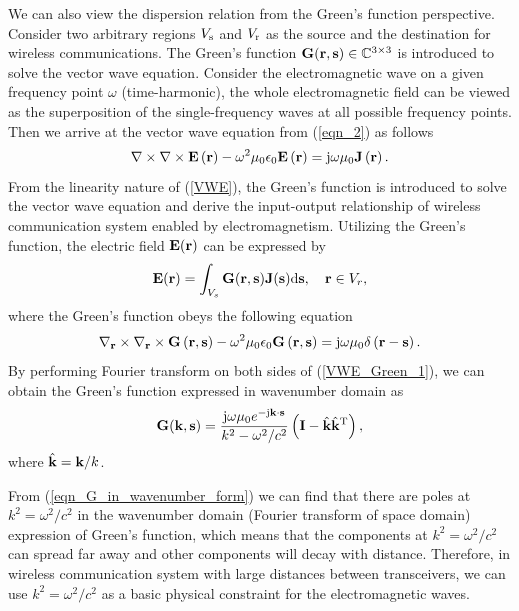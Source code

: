 \documentclass[12pt,draftclsnofoot,journal,onecolumn]{IEEEtran}
\begin{document}
{We can also view the dispersion relation from the Green's function perspective. Consider two arbitrary regions $V_{\rm s}$ and $V_{\rm r}$ as the source and the destination for wireless communications. The Green's function ${\bf{G}} ({\bf{r}},{\bf{s}})\in \mathbb{C}^{3\times 3}$ is introduced to solve the vector wave equation. Consider the electromagnetic wave on a given frequency point $\omega$ (time-harmonic)\cite{gruber2008new}, the whole electromagnetic field can be viewed as the superposition of the single-frequency waves at all possible frequency points. Then we arrive at the vector wave equation from (\ref{eqn_2}) as follows
\begin{equation}
\nabla  \times \nabla  \times {\bf{E}}\left( {\bf{r}} \right) - {\omega ^2 \mu_0 \epsilon_0}{\bf{E}}\left( {\bf{r}} \right) = {\rm j}\omega {\mu _0}{\bf{J}}\left( {\bf{r}} \right).
\label{VWE}
\end{equation}
From the linearity nature of (\ref{VWE}), the Green's function is introduced to solve the vector wave equation and derive the input-output relationship of wireless communication system enabled by electromagnetism. 
Utilizing the Green's function, the electric field ${\bf{E}}({\bf{r}})$ can be expressed by  
\begin{equation}
	{\bf{E}}({\bf{r}}) = \int_{{V_s}} {\bf{G}} ({\bf{r}},{\bf{s}}){\bf{J}}({\bf{s}}){\rm d}{\bf{s}},\quad {\bf{r}} \in {V_r},
	\label{VWE_Green}
\end{equation}
where the Green's function obeys the following equation
\begin{equation}
	\nabla_{\bf r}  \times \nabla_{\bf r}  \times {\bf{G}}\left( {\bf{r}},{\bf {s}} \right) - {\omega ^2 \mu_0 \epsilon_0}{\bf{G}}\left( {\bf{r}},{\bf {s}} \right) = {\rm j}\omega {\mu _0}\delta\left( {\bf{r}}-{\bf {s}} \right).
	\label{VWE_Green_1}
\end{equation}
By performing Fourier transform on both sides of (\ref{VWE_Green_1})\cite{poon2005degrees}, we can obtain the Green's function expressed in wavenumber domain as 
\begin{equation}
	{\bf G}({\bf k},{\bf s}) = \frac{{\rm j}\omega\mu_0 e^{-{\rm j}{\bf k}\cdot {\bf s}}}{k^2-\omega^2/c^2}\left({\bf I} - \hat{\bf k}\hat{\bf k}^{\rm T}  \right),
	\label{eqn_G_in_wavenumber_form}
\end{equation}
where $\hat{\bf k} = {\bf k}/k$.

From (\ref{eqn_G_in_wavenumber_form}) we can find that there are poles at $k^2 = \omega^2/c^2$ in the wavenumber domain (Fourier transform of space domain) expression of Green's function, which means that the components at $k^2 = \omega^2/c^2$ can spread far away and other components will decay with distance. Therefore, in wireless communication system with large distances between transceivers, we can use $k^2 = \omega^2/c^2$ as a basic physical constraint for the electromagnetic waves. 



}
\end{document}
